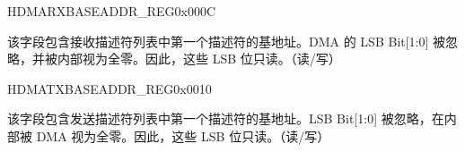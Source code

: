 \begin{register}{H}{DMARXBASEADDR\_REG}{0x000C}\label{regdesc:DMARXBASEADDRREG}
%
\regnewline%
\begin{regdesc}\begin{reglist}
\item [START\_RECV\_LIST]该字段包含接收描述符列表中第一个描述符的基地址。DMA 的 LSB Bit[1:0] 被忽略，并被内部视为全零。因此，这些 LSB 位只读。（读/写）
\end{reglist}\end{regdesc}
\end{register}


\begin{register}{H}{DMATXBASEADDR\_REG}{0x0010}\label{regdesc:DMATXBASEADDRREG}
%
\regnewline%
\begin{regdesc}\begin{reglist}
\item [START\_TRANS\_LIST]该字段包含发送描述符列表中第一个描述符的基地址。LSB Bit[1:0] 被忽略，在内部被 DMA 视为全零。因此，这些 LSB 位只读。（读/写）
\end{reglist}\end{regdesc}
\end{register}


